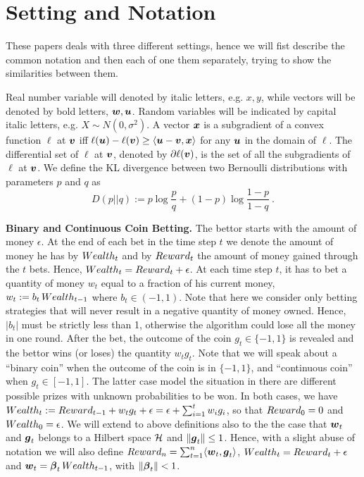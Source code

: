 \section{Setting and Notation}
These papers deals with three different settings, hence we will fist describe the common notation and then each of one them separately, trying to show the similarities between them.

Real number variable will denoted by italic letters, e.g. $x,y$, while vectors will be denoted by bold letters, $\boldsymbol{w},\boldsymbol{u}$.
Random variables will be indicated by capital italic letters, e.g. $X \sim N(0,\sigma^2)$.
A vector $\boldsymbol{x}$ is a subgradient of a convex function $\ell$ at $\boldsymbol{v}$ iff $\ell(\boldsymbol{u}) - \ell(\boldsymbol{v}) \ge \langle \boldsymbol{u} - \boldsymbol{v}, \boldsymbol{x} \rangle$ for any $\boldsymbol{u}$ in the domain of $\ell$. The differential set of $\ell$ at $\boldsymbol{v}$, denoted by $\partial \ell(\boldsymbol{v})$, is the set of all the subgradients of $\ell$ at $\boldsymbol{v}$.
We define the KL divergence between two Bernoulli distributions with parameters $p$ and $q$ as
\[
D(p||q) := p \log\frac{p}{q} + (1-p) \log\frac{1-p}{1-q}~.
\]

\vspace{0.2cm}\noindent\textbf{Binary and Continuous Coin Betting.}
The bettor starts with the amount of money $\epsilon$. 
At the end of each bet in the time step $t$ we denote the amount of money he has by $Wealth_t$ and by $Reward_t$ the amount of money gained through the $t$ bets. Hence, $Wealth_t=Reward_t+\epsilon$.
At each time step $t$, it has to bet a quantity of money $w_t$ equal to a fraction of his current money, $w_t:=b_t \, Wealth_{t-1}$ where $b_t \in (-1,1)$. Note that here we consider only betting strategies that will never result in a negative quantity of money owned. Hence, $|b_t|$ must be strictly less than 1, otherwise the algorithm could lose all the money in one round.
After the bet, the outcome of the coin $g_t \in \{-1,1\}$ is revealed and the bettor wins (or loses) the quantity $w_t g_t$.
Note that we will speak about a ``binary coin'' when the outcome of the coin is in $\{-1,1\}$, and ``continuous coin'' when $g_t \in [-1,1]$. The latter case model the situation in there are different possible prizes with unknown probabilities to be won. In both cases, we have $Wealth_t:=Reward_{t-1} + w_t g_t + \epsilon= \epsilon + \sum_{i=1}^t w_i g_i$, so that $Reward_0=0$ and $Wealth_0=\epsilon$.
We will extend to above definitions also to the the case that $\boldsymbol{w}_t$ and $\boldsymbol{g}_t$ belongs to a Hilbert space $\mathcal{H}$ and $\left\|{\boldsymbol{g}_t}\right\|\leq 1$. Hence, with a slight abuse of notation we will also define $Reward_n=\sum_{t=1}^n \langle \boldsymbol{w}_t, \boldsymbol{g}_t \rangle$, $Wealth_t=Reward_t + \epsilon$ and $\boldsymbol{w}_t = \boldsymbol{\beta}_t \, Wealth_{t-1}$, with $\left\|{\boldsymbol{\beta}_t}\right\| < 1$.

